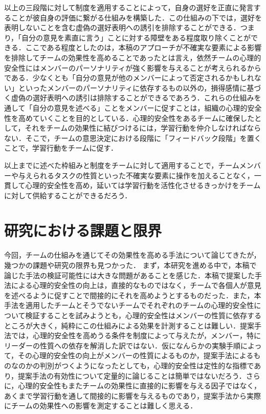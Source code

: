 \documentclass[a4paper, 11pt]{jsarticle}
\begin{document}
以上の三段階に対して制度を適用することによって，自身の選好を正直に発言することが彼自身の評価に繋がる仕組みを構築した．この仕組みの下では，選好を表明しないことを含む虚偽の選好表明への誘引を排除することができる．つまり，「自分の意見を素直に言う」ことに対する障壁をある程度取り除くことができる．ここである程度としたのは，本稿のアプローチが不確実な要素による影響を排除してチームの効果性を高めることであったとは言え，依然チームの心理的安全性にはメンバーのパーソナリティが強く影響を与えることが考えられるからである．少なくとも「自分の意見が他のメンバーによって否定されるかもしれない」といったメンバーのパーソナリティに依存するもの以外の，損得感情に基づく虚偽の選好表明への誘引は排除することができるであろう．これらの仕組みを通して「自分の意見を述べる」ことをメンバーに促すことは，組織の心理的安全性を高めていくことを目的としている．心理的安全性をあるチームに確保したとして，それをチームの効果性に結びつけるには，学習行動を仲介しなければならない．そこで，チームの意思決定における段階に「フィードバック段階」を置くことで，学習行動をチームに促す．


以上までに述べた枠組みと制度をチームに対して適用することで，チームメンバーや与えられるタスクの性質といった不確実な要素に操作を加えることなく，一貫して心理的安全性を高め，延いては学習行動を活性化させるきっかけをチームに対して供給することができるだろう．

\section{研究における課題と限界}
今回，チームの仕組みを通じてその効果性を高める手法について論じてきたが，幾つかの課題や研究の限界も見つかった．
まず，本研究を進める中で，本稿で論じた手法の検証可能性には大きな問題があることを感じた．本稿で提案した手法による心理的安全性の向上は，直接的なものではなく，チームで各個人が意見を述べるように促すことで間接的にそれを高めようとするものだった．また，本手法を適用したチームとそうでないチームでそれぞれのチームの心理的安全性について検証することを試みようとも，心理的安全性はメンバーの性質に依存するところが大きく，純粋にこの仕組みによる効果を計測することは難しい．提案手法では，心理的安全性を高めうる条件を制度によって与えたが，メンバー，特にリーダーの性質への依存を解消した訳ではない．仮になんらかの実験手順によって，その心理的安全性の向上がメンバーの性質によるものか，提案手法によるものなのかの判別がつくようになったとしても，心理的安全性は定性的な指標であり，提案手法の有効性について定量的に論じることは簡単ではないだろう．さらに，心理的安全性もまたチームの効果性に直接的に影響を与える因子ではなく，あくまで学習行動を通して間接的に影響を与えるものであり，提案手法から実際にチームの効果性への影響を測定することは難しく思える．
\end{document}
